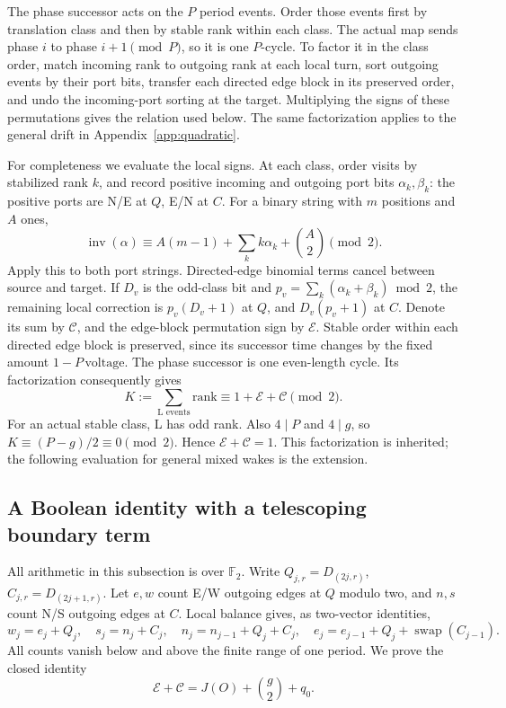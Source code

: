 The phase successor acts on the $P$ period events. Order those events
first by translation class and then by stable rank within each class. The
actual map sends phase $i$ to phase $i+1\pmod P$, so it is one $P$-cycle.
To factor it in the class order, match incoming rank to outgoing rank at
each local turn, sort outgoing events by their port bits, transfer each
directed edge block in its preserved order, and undo the incoming-port
sorting at the target. Multiplying the signs of these permutations gives
the relation used below. The same factorization applies to the general
drift in Appendix~\ref{app:quadratic}.

For completeness we evaluate the local signs.
At each class, order visits by stabilized rank \(k\), and record positive
incoming and outgoing port bits \(\alpha_k,\beta_k\): the positive ports
are N/E at \(Q\), E/N at \(C\). For a binary string with \(m\) positions
and \(A\) ones,
\[
 \operatorname{inv}(\alpha)
 \equiv A(m-1)+\sum_k k\alpha_k+\binom A2\pmod2.
\]
Apply this to both port strings. Directed-edge binomial terms cancel between
source and target. If \(D_v\) is the odd-class bit and
\(p_v=\sum_k(\alpha_k+\beta_k)\bmod2\), the remaining local correction is
\(p_v(D_v+1)\) at \(Q\), and \(D_v(p_v+1)\) at \(C\).
Denote its sum by \(\mathcal C\), and the edge-block permutation sign by
\(\mathcal E\). Stable order within each directed edge block is preserved,
since its successor time changes by the fixed amount \(1-P\,\mathrm{voltage}\).
The phase successor is one even-length cycle. Its factorization consequently
gives
\[
 K:=\sum_{\text{L events}}\mathrm{rank}
 \equiv1+\mathcal E+\mathcal C\pmod2.
\]
For an actual stable class, L has odd rank. Also \(4\mid P\) and
\(4\mid g\), so \(K\equiv(P-g)/2\equiv0\pmod2\). Hence
\(\mathcal E+\mathcal C=1\). This factorization is inherited; the following
evaluation for general mixed wakes is the extension.

\subsection{A Boolean identity with a telescoping boundary term}
All arithmetic in this subsection is over \(\mathbb F_2\). Write
\(Q_{j,r}=D_{(2j,r)}\), \(C_{j,r}=D_{(2j+1,r)}\). Let \(e,w\) count
E/W outgoing edges at \(Q\) modulo two, and \(n,s\) count N/S outgoing
edges at \(C\). Local balance gives, as two-vector identities,
\[
 w_j=e_j+Q_j,\quad s_j=n_j+C_j,\quad
 n_j=n_{j-1}+Q_j+C_j,\quad
 e_j=e_{j-1}+Q_j+\operatorname{swap}(C_{j-1}).
\]
All counts vanish below and above the finite range of one period.
We prove the closed identity
\[
 \mathcal E+\mathcal C=J(O)+\binom g2+q_0.                 \tag{*}
\]

